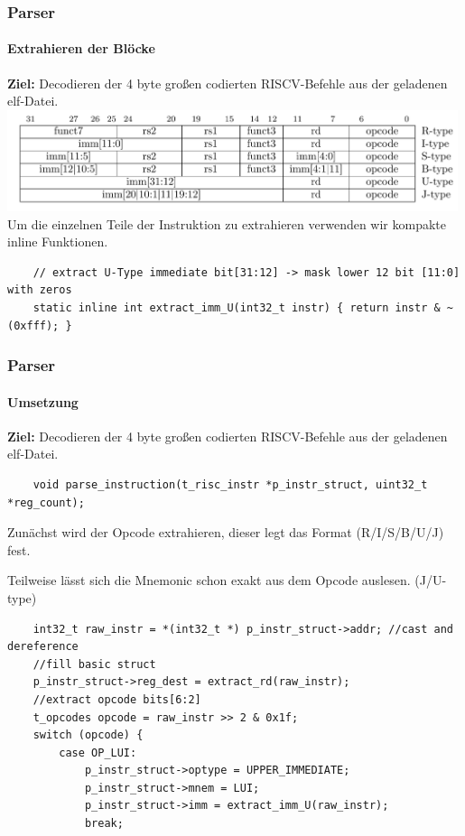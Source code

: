 \documentclass[german]{tum-presentation}
\begin{document}
\begin{frame}[fragile]
	\frametitle{Parser}
	\framesubtitle{Extrahieren der Blöcke}
	\textbf{Ziel:} Decodieren der 4 byte großen codierten RISCV-Befehle aus der geladenen elf-Datei.
	\includegraphics[width=0.99\textwidth]{diagrams/optypes}
	\pause
	Um die einzelnen Teile der Instruktion zu extrahieren verwenden wir kompakte inline Funktionen. 
	\begin{lstlisting}
	// extract U-Type immediate bit[31:12] -> mask lower 12 bit [11:0] with zeros
	static inline int extract_imm_U(int32_t instr) { return instr & ~(0xfff); }
	\end{lstlisting}
\end{frame}

\begin{frame}[fragile]
	\frametitle{Parser}
	\framesubtitle{Umsetzung}
	\textbf{Ziel:} Decodieren der 4 byte großen codierten RISCV-Befehle aus der geladenen elf-Datei.
	\begin{lstlisting}
	void parse_instruction(t_risc_instr *p_instr_struct, uint32_t *reg_count);
	\end{lstlisting}
	Zunächst wird der Opcode extrahieren, dieser legt das Format (R/I/S/B/U/J) fest.
	
	Teilweise lässt sich die Mnemonic schon exakt aus dem Opcode auslesen. (J/U-type)
	\begin{lstlisting}
    int32_t raw_instr = *(int32_t *) p_instr_struct->addr; //cast and dereference
    //fill basic struct
    p_instr_struct->reg_dest = extract_rd(raw_instr);
    //extract opcode bits[6:2]
    t_opcodes opcode = raw_instr >> 2 & 0x1f;
    switch (opcode) {
        case OP_LUI:
            p_instr_struct->optype = UPPER_IMMEDIATE;
            p_instr_struct->mnem = LUI;
            p_instr_struct->imm = extract_imm_U(raw_instr);
            break;
	\end{lstlisting}
\end{frame}
\end{document}
